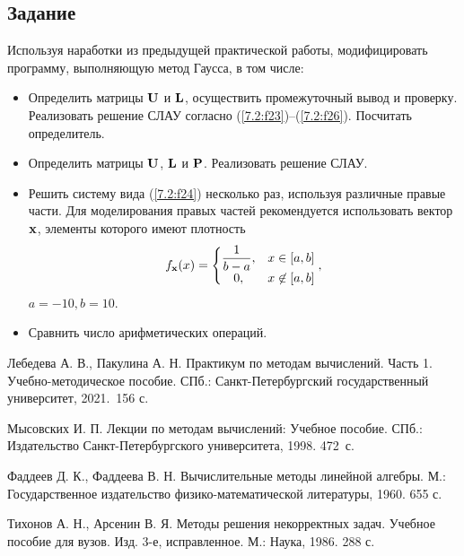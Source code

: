 \documentclass[12pt]{article}
\begin{document}
    \subsection*{Задание}
	
	Используя наработки из предыдущей практической работы, модифицировать программу, выполняющую метод Гаусса, в том числе:
	\begin{itemize}
	    \item Определить матрицы $\bold{U}$ и $\bold{L}$, осуществить промежуточный вывод и проверку. Реализовать решение СЛАУ согласно (\ref{7.2:f23})--(\ref{7.2:f26}). Посчитать определитель.
	    
	    \item Определить матрицы $\bold{U}$, $\bold{L}$ и $\bold{P}$. Реализовать решение СЛАУ.
	
	    \item Решить систему вида (\ref{7.2:f24}) несколько раз, используя различные правые части. Для моделирования правых частей рекомендуется использовать вектор~$\bold{x}$, элементы которого имеют плотность
	    \begin{equation}
	        f_{\bold{x}}(x)=
	        	\left\{{
	        	\begin{matrix}
	        		{\dfrac {1}{b-a}},&x\in [a,b]\\0,&x\not \in [a,b]
	        	\end{matrix}}
        		\right.,
	    \end{equation}
	    $a=-10, b=10$.
	    
	    \item Сравнить число арифметических операций.
	\end{itemize}

    \renewcommand{\bibname}{{Список литературы}}
    
    \begin{thebibliography}{4}
        Лебедева А. В., Пакулина А. Н. Практикум по методам вычислений. Часть 1. Учебно-методическое пособие. СПб.: Санкт-Петербургский государственный университет, 2021.~156 с.
        
        Мысовских И. П. Лекции по методам вычислений: Учебное пособие. СПб.: Издательство Санкт-Петербургского университета, 1998. 472~с.
        
        Фаддеев Д. К., Фаддеева В. Н. Вычислительные методы линейной алгебры. М.:  Государственное издательство физико-математической литературы, 1960. 655 с.
        
        Тихонов А. Н., Арсенин В. Я. Методы решения некорректных задач. Учебное пособие для вузов. Изд. 3-е, исправленное. М.: Наука, 1986. 288 с.
    \end{thebibliography}
\end{document}
